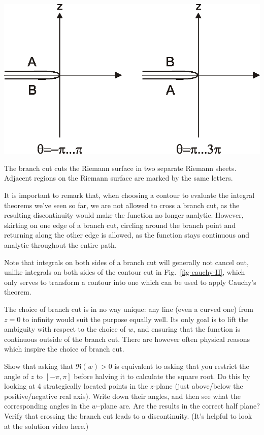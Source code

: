 \begin{marginfigure}[-2cm]
\centering
\includegraphics{complex/figures/sheets}
\caption{The branch cut cuts the Riemann surface in two separate Riemann sheets.
Adjacent regions on the Riemann surface are marked by the same letters.}
\label{fig-sheets}
\end{marginfigure}
It is important to remark that, when choosing a contour to evaluate the integral theorems we've seen so far, we are not allowed to cross a branch cut, as the resulting discontinuity would make the function no longer analytic. However, skirting on one edge of a branch cut, circling around the branch point and returning along the other edge is allowed, as the function stays continuous and analytic throughout the entire path. 

Note that integrals on both sides of a branch cut will generally not cancel out, unlike integrals on both sides of the contour cut in Fig.~\ref{fig-cauchy-II}, which only serves to transform a contour into one which can be used to apply Cauchy's theorem.

\noindent{}The choice of branch cut is in no way unique: any line (even a curved one) from $z=0$ to infinity would suit the purpose equally well. Its only goal is to lift the ambiguity with respect to the choice of $w$, and ensuring that the function is continuous outside of the branch cut. There are however often physical reasons which inspire the choice of branch cut.

\pagebreak

\begin{exer}
\label{ex-branch-ang}
Show that asking that $\Re(w)>0$ is equivalent to asking that you restrict the angle of $z$ to $[-\pi, \pi]$ before halving it to calculate the square root. Do this by looking at 4 strategically located points in the $z$-plane (just above/below the positive/negative real axis). Write down their angles, and then see what the corresponding angles in the $w$--plane are. Are the results in the correct half plane? Verify that crossing the branch cut leads to a discontinuity. (It's helpful to look at the solution video here.)
\end{exer}

